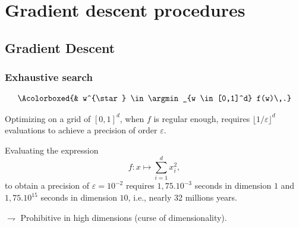 \documentclass[xcolor={usenames,dvipsnames}]{beamer}
\begin{document}
\section{Gradient descent procedures}

\subsection{Gradient Descent}

%	
%			
%			
%	
%	
%	
%
%
%	
%	
%	
%	
%	
%
%
%

\begin{frame}
	\frametitle{Exhaustive search}
	
	
\begin{align*}
\Acolorboxed{&
w^{\star} \in \argmin_{w \in [0,1]^d} f(w)\,.}
\end{align*}

\smallskip

Optimizing on a grid of $[0,1]^d$, when $f$ is regular enough, \alert{requires $\lfloor 1/\varepsilon \rfloor^d$ evaluations  to achieve a precision of order  $\varepsilon$}. 

Evaluating the expression
$$
f: x \mapsto \sum_{i=1}^d x_i^2,
$$
to obtain a precision of $\varepsilon = 10^{-2}$ requires  \alert{$1,75. 10^{-3}$ seconds in dimension $1$ and $1,75. 10^{15}$ seconds in dimension $10$}, i.e., nearly 32 millions years. 

\vspace{.3cm}

$\rightharpoondown$  Prohibitive in high dimensions (curse of dimensionality).
\end{frame}
\end{document}
